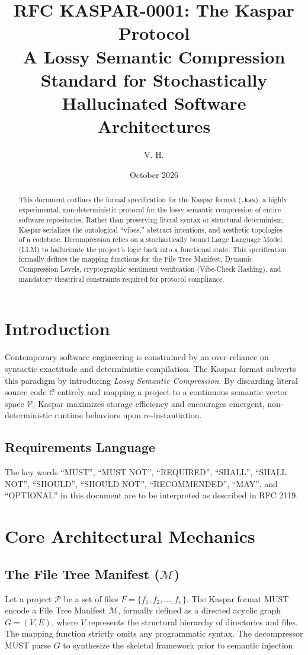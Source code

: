 \documentclass[11pt, a4paper]{article}
\title{\textbf{RFC KASPAR-0001: The Kaspar Protocol}\\
\large A Lossy Semantic Compression Standard for Stochastically Hallucinated Software Architectures}
\author{V. H.}
\date{October 2026}
\begin{document}
\maketitle

\begin{abstract}
This document outlines the formal specification for the Kaspar format (\texttt{.kas}), a highly experimental, non-deterministic protocol for the lossy semantic compression of entire software repositories. Rather than preserving literal syntax or structural determinism, Kaspar serializes the ontological ``vibes,'' abstract intentions, and aesthetic topologies of a codebase. Decompression relies on a stochastically bound Large Language Model (LLM) to hallucinate the project's logic back into a functional state. This specification formally defines the mapping functions for the File Tree Manifest, Dynamic Compression Levels, cryptographic sentiment verification (Vibe-Check Hashing), and mandatory theatrical constraints required for protocol compliance.
\end{abstract}

\section{Introduction}
Contemporary software engineering is constrained by an over-reliance on syntactic exactitude and deterministic compilation. The Kaspar format subverts this paradigm by introducing \textit{Lossy Semantic Compression}. By discarding literal source code $\mathcal{C}$ entirely and mapping a project to a continuous semantic vector space $\mathcal{V}$, Kaspar maximizes storage efficiency and encourages emergent, non-deterministic runtime behaviors upon re-instantiation.

\subsection{Requirements Language}
The key words ``MUST'', ``MUST NOT'', ``REQUIRED'', ``SHALL'', ``SHALL NOT'', ``SHOULD'', ``SHOULD NOT'', ``RECOMMENDED'', ``MAY'', and ``OPTIONAL'' in this document are to be interpreted as described in RFC 2119.

\section{Core Architectural Mechanics}

\subsection{The File Tree Manifest ($\mathcal{M}$)}
Let a project $\mathcal{P}$ be a set of files $F = \{f_1, f_2, \dots, f_n\}$. The Kaspar format MUST encode a File Tree Manifest $\mathcal{M}$, formally defined as a directed acyclic graph $G = (V, E)$, where $V$ represents the structural hierarchy of directories and files. The mapping function strictly omits any programmatic syntax. The decompressor MUST parse $G$ to synthesize the skeletal framework prior to semantic injection.
\end{document}
